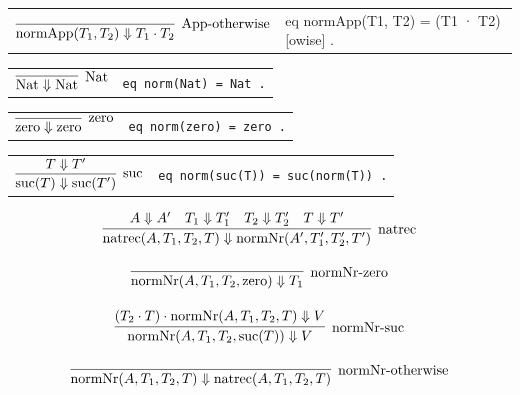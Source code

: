 \begin{center}
\begin{tabular}{@{}c@{\qquad}p{6cm}@{}}
  $\infer[\text{App-otherwise}]
  {\mathrm{normApp}(T_1, T_2) \Downarrow T_1 \cdot T_2}
  {}$
  &
  {\ttfamily
    eq normApp(T1, T2) =\newline
    \hspace*{1.5em}(T1 · T2) [owise] .
  }
\end{tabular}
\end{center}

\begin{center}
\begin{tabular}{@{}c@{\qquad}l@{}}
  $\infer[\text{Nat}]
  {\mathrm{Nat} \Downarrow \mathrm{Nat}}
  {}$
  &
    \verb|eq norm(Nat) = Nat .|
\end{tabular}
\end{center}

\begin{center}
\begin{tabular}{@{}c@{\qquad}l@{}}
  $\infer[\text{zero}]
  {\mathrm{zero} \Downarrow \mathrm{zero}}
  {}$
  &
    \verb|eq norm(zero) = zero .|
\end{tabular}
\end{center}

\begin{center}
\begin{tabular}{@{}c@{\qquad}l@{}}
  $\infer[\text{suc}]
  {\mathrm{suc}(T) \Downarrow \mathrm{suc}(T')}
  {T \Downarrow T'}$
  &
    \verb|eq norm(suc(T)) = suc(norm(T)) .|
\end{tabular}
\end{center}

\begin{gather*}
  \infer[\text{natrec}]
  {\mathrm{natrec}(A, T_1, T_2, T) \Downarrow \mathrm{normNr}(A', T_1', T_2', T')}
  {A \Downarrow A' \quad T_1 \Downarrow T_1' \quad T_2 \Downarrow T_2' \quad T \Downarrow T'}
  \\[1em]
  \infer[\text{normNr-zero}]
  {\mathrm{normNr}(A, T_1, T_2, \mathrm{zero}) \Downarrow T_1}
  {}
  \\[1em]
  \infer[\text{normNr-suc}]
  {\mathrm{normNr}(A, T_1, T_2, \mathrm{suc}(T)) \Downarrow V}
  {(T_2 \cdot T) \cdot \mathrm{normNr}(A, T_1, T_2, T) \Downarrow V}
  \\[1em]
  \infer[\text{normNr-otherwise}]
  {\mathrm{normNr}(A, T_1, T_2, T) \Downarrow \mathrm{natrec}(A, T_1, T_2, T)}
  {}
\end{gather*}

